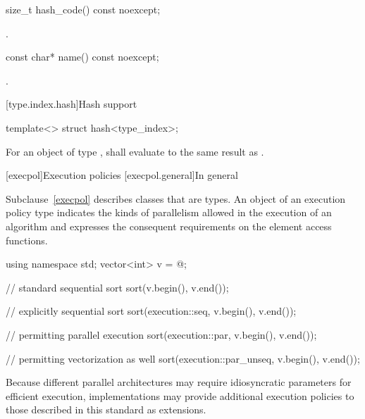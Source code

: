 %
\begin{itemdecl}
size_t hash_code() const noexcept;
\end{itemdecl}

\begin{itemdescr}
\pnum
\returns
{}.
\end{itemdescr}

%
\begin{itemdecl}
const char* name() const noexcept;
\end{itemdecl}

\begin{itemdescr}
\pnum
\returns
{}.
\end{itemdescr}

[type.index.hash]{Hash support}

%
\begin{itemdecl}
template<> struct hash<type_index>;
\end{itemdecl}

\begin{itemdescr}
\pnum
For an object  of type ,
 shall evaluate to the same result as .
\end{itemdescr}

[execpol]{Execution policies}
[execpol.general]{In general}

\pnum
Subclause~\ref{execpol} describes classes that are  types. An
object of an execution policy type indicates the kinds of parallelism allowed
in the execution of an algorithm and expresses the consequent requirements on
the element access functions.
\begin{example}
\begin{codeblock}
using namespace std;
vector<int> v = @\commentellip@;

// standard sequential sort
sort(v.begin(), v.end());

// explicitly sequential sort
sort(execution::seq, v.begin(), v.end());

// permitting parallel execution
sort(execution::par, v.begin(), v.end());

// permitting vectorization as well
sort(execution::par_unseq, v.begin(), v.end());
\end{codeblock}
\end{example}
\begin{note}
Because different parallel architectures may require idiosyncratic
parameters for efficient execution, implementations
may provide additional execution policies to those described in this
standard as extensions.
\end{note}

